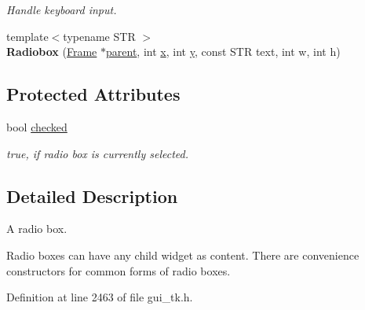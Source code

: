 \begin{DoxyCompactItemize}
\begin{DoxyCompactList}\small\item\em Handle keyboard input. \end{DoxyCompactList}\item 
\hypertarget{classGUI_1_1Radiobox_a1043df1e70f217de9e5e61563f5d8ef1}{{\footnotesize template$<$typename S\-T\-R $>$ }\\{\bfseries Radiobox} (\hyperlink{classGUI_1_1Frame}{Frame} $\ast$\hyperlink{classGUI_1_1Window_a2e593ff65e7702178d82fe9010a0b539}{parent}, int \hyperlink{classGUI_1_1Window_a6ca6a80ca00c9e1d8ceea8d3d99a657d}{x}, int \hyperlink{classGUI_1_1Window_a0ee8e923aff2c3661fc2e17656d37adf}{y}, const S\-T\-R text, int w, int h)}\label{classGUI_1_1Radiobox_a1043df1e70f217de9e5e61563f5d8ef1}

\end{DoxyCompactItemize}
\subsection*{Protected Attributes}
\begin{DoxyCompactItemize}
\item 
\hypertarget{classGUI_1_1Radiobox_ace7ecfe96f9746040c020362d13d7046}{bool \hyperlink{classGUI_1_1Radiobox_ace7ecfe96f9746040c020362d13d7046}{checked}}\label{classGUI_1_1Radiobox_ace7ecfe96f9746040c020362d13d7046}

\begin{DoxyCompactList}\small\item\em {\ttfamily true}, if radio box is currently selected. \end{DoxyCompactList}\end{DoxyCompactItemize}


\subsection{Detailed Description}
A radio box. 

Radio boxes can have any child widget as content. There are convenience constructors for common forms of radio boxes. 

Definition at line 2463 of file gui\-\_\-tk.\-h.



